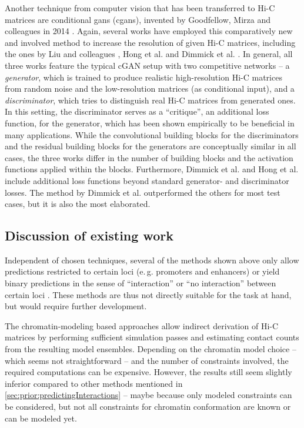 Another technique from computer vision that has been transferred to Hi-C matrices are conditional \acrlong{gan}s (c\acrshort{gan}s), 
invented by Goodfellow, Mirza and colleagues in 2014 \cite{Goodfellow2014, mirza2014}. 
Again, several works have employed this comparatively new and involved method to increase the resolution of given Hi-C matrices, 
including the ones by Liu and colleagues \cite{Liu2019}, Hong et al. \cite{Hong2020} and Dimmick et al. \cite{Dimmick2020}.
In general, all three works feature the typical cGAN setup with two competitive networks -- a \emph{generator}, 
which is trained to produce realistic high-resolution Hi-C matrices from random noise and the low-resolution matrices (as conditional input), 
and a \emph{discriminator}, which tries to distinguish real Hi-C matrices from generated ones.
In this setting, the discriminator serves as a ``critique'', an additional loss function, for the generator,
which has been shown empirically to be beneficial in many applications.
While the convolutional building blocks for the discriminators and the residual building blocks for the generators are conceptually similar
in all cases, the three works differ in the number of building blocks and the activation functions applied within the blocks.
Furthermore, Dimmick et al. and Hong et al. include additional loss functions beyond standard generator- and discriminator losses. 
The method by Dimmick et al. outperformed the others for most test cases, but it is also the most elaborated.

\subsection{Discussion of existing work} \label{sec:prior:discussion}
Independent of chosen techniques, several of the methods shown above only allow predictions restricted to certain loci (e.\,g. promoters and enhancers)
or yield binary predictions in the sense of ``interaction'' or ``no interaction'' between certain loci \cite{Bkhetan2018, Kai2018,Martens2020,Singh2019}.
These methods are thus not directly suitable for the task at hand, but would require further development.

The chromatin-modeling based approaches \cite{Brackley2016, MacPherson2018, Pierro2017, Qi2019} allow indirect derivation of Hi-C matrices
by performing sufficient simulation passes and estimating contact counts from the resulting model ensembles.
Depending on the chromatin model choice -- which seems not straightforward \cite{Huang2018, Bendandi2020} -- and the number of constraints involved,
the required computations can be expensive.
However, the results still seem slightly inferior compared to other methods mentioned in \cref{sec:prior:predictingInteractions} --
maybe because only modeled constraints can be considered, but not all constraints for chromatin conformation are known or can be modeled yet.

